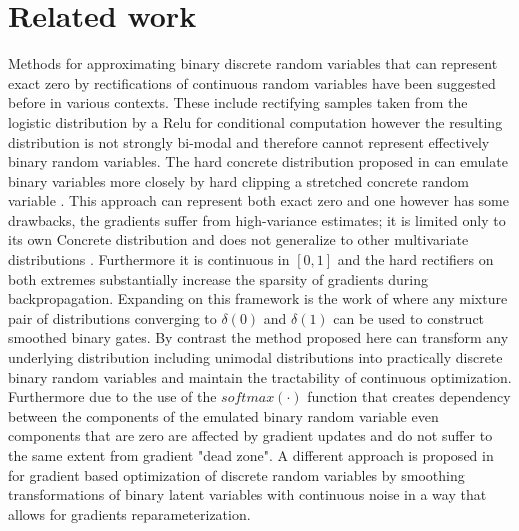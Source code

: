 \documentclass[final,1p,times]{elsarticle}
\begin{document}
\section{Related work}
\label{S:RelatedWork}
Methods for approximating binary discrete random variables that can represent exact zero by rectifications of continuous random variables have been suggested before in various contexts. These include rectifying samples taken from the logistic distribution by a Relu for conditional computation \cite{journals/corr/BengioLC13} however the resulting distribution is not strongly bi-modal and therefore cannot represent effectively binary random variables. The hard concrete distribution proposed in \cite{louizos2018learning} can emulate binary variables more closely by hard clipping a stretched concrete random variable \cite{maddison2016concrete, 45822}. This approach can represent both exact zero and one however has some drawbacks, the gradients suffer from high-variance estimates; it is limited only to its own Concrete distribution and does not generalize to other multivariate distributions \cite{Huang_2020_CVPR_Workshops}. Furthermore it is continuous in $[0,1]$ and the hard rectifiers on both extremes substantially increase the sparsity of gradients during backpropagation. Expanding on this framework is the work of \cite{Huang_2020_CVPR_Workshops} where any mixture pair of distributions converging to $\delta(0)$ and $\delta(1)$ can be used to construct smoothed binary gates. By contrast the method proposed here can transform any underlying distribution including unimodal distributions into practically discrete binary random variables and maintain the tractability of continuous optimization. Furthermore due to the use of the $softmax(\cdot)$ function that creates dependency between the components of the emulated binary random variable even components that are zero are affected by gradient updates and do not suffer to the same extent from gradient "dead zone". A different approach is proposed in \cite{rolfe2017discrete} for gradient based optimization of discrete random variables by smoothing transformations of binary latent variables with continuous noise in a way that allows for gradients reparameterization.
\end{document}

